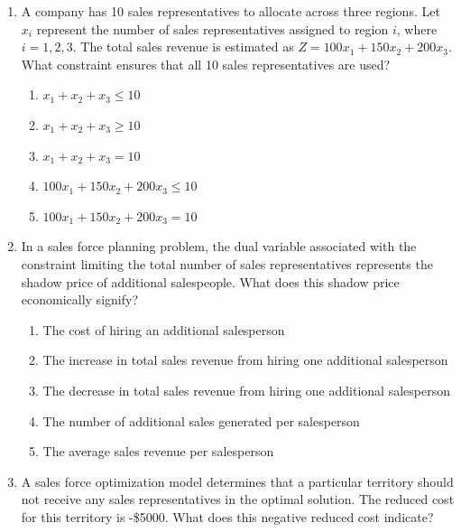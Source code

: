 \documentclass{article}%
\begin{document}
\begin{enumerate}
\begin{enumerate}
\item A transportation problem%
\item An assignment problem%
\item A diet problem%
\item A production planning problem%
\item A network flow problem%
\end{enumerate}%
\vspace{1em}%
\item A company has 10 sales representatives to allocate across three regions.  Let $x_i$ represent the number of sales representatives assigned to region $i$, where $i = 1, 2, 3$.  The total sales revenue is estimated as $Z = 100x_1 + 150x_2 + 200x_3$. What constraint ensures that all 10 sales representatives are used?%
\begin{enumerate}%
\item $x_1 + x_2 + x_3 \le 10$%
\item $x_1 + x_2 + x_3 \ge 10$%
\item $x_1 + x_2 + x_3 = 10$%
\item $100x_1 + 150x_2 + 200x_3 \le 10$%
\item $100x_1 + 150x_2 + 200x_3 = 10$%
\end{enumerate}%
\vspace{1em}%
\item In a sales force planning problem, the dual variable associated with the constraint limiting the total number of sales representatives represents the shadow price of additional salespeople.  What does this shadow price economically signify?%
\begin{enumerate}%
\item The cost of hiring an additional salesperson%
\item The increase in total sales revenue from hiring one additional salesperson%
\item The decrease in total sales revenue from hiring one additional salesperson%
\item The number of additional sales generated per salesperson%
\item The average sales revenue per salesperson%
\end{enumerate}%
\vspace{1em}%
\item A sales force optimization model determines that a particular territory should not receive any sales representatives in the optimal solution. The reduced cost for this territory is -\$5000. What does this negative reduced cost indicate?%

\end{enumerate}
\end{document}
